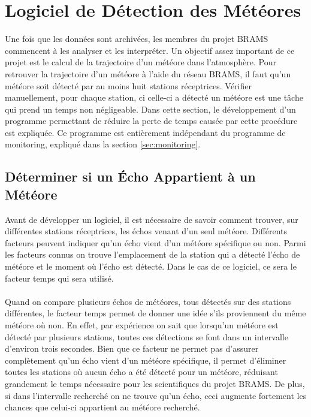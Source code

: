 \documentclass[11pt]{article}
\begin{document}
\newpage

\section{Logiciel de Détection des Météores}

Une fois que les données sont archivées, les membres du projet BRAMS commencent à les analyser et les interpréter.
Un objectif assez important de ce projet est le calcul de la trajectoire d'un météore dans l'atmosphère.
Pour retrouver la trajectoire d'un météore à l'aide du réseau BRAMS, il faut qu'un météore soit détecté par au moins huit stations réceptrices.
Vérifier manuellement, pour chaque station, ci celle-ci a détecté un météore est une tâche qui prend un temps non négligeable.
Dans cette section, le développement d'un programme permettant de réduire la perte de temps causée par cette procédure est expliquée.
Ce programme est entièrement indépendant du programme de monitoring, expliqué dans la section \ref{sec:monitoring}.

\subsection{Déterminer si un Écho Appartient à un Météore}

Avant de développer un logiciel, il est nécessaire de savoir comment trouver, sur différentes stations réceptrices, les échos venant d'un seul météore.
Différents facteurs peuvent indiquer qu'un écho vient d'un météore spécifique ou non.
Parmi les facteurs connus on trouve l'emplacement de la station qui a détecté l'écho de météore et le moment où l'écho est détecté.
Dans le cas de ce logiciel, ce sera le facteur temps qui sera utilisé.\\
\\
Quand on compare plusieurs échos de météores, tous détectés sur des stations différentes, le facteur temps permet de donner une idée s'ils proviennent du même météore où non.
En effet, par expérience on sait que lorsqu'un météore est détecté par plusieurs stations, toutes ces détections se font dans un intervalle d'environ trois secondes.
Bien que ce facteur ne permet pas d'assurer complètement qu'un écho vient d'un météore spécifique, il permet d'éliminer toutes les stations où aucun écho a été détecté pour un météore, réduisant grandement le temps nécessaire pour les scientifiques du projet BRAMS.
De plus, si dans l'intervalle recherché on ne trouve qu'un écho, ceci augmente fortement les chances que celui-ci appartient au météore recherché.
\end{document}

